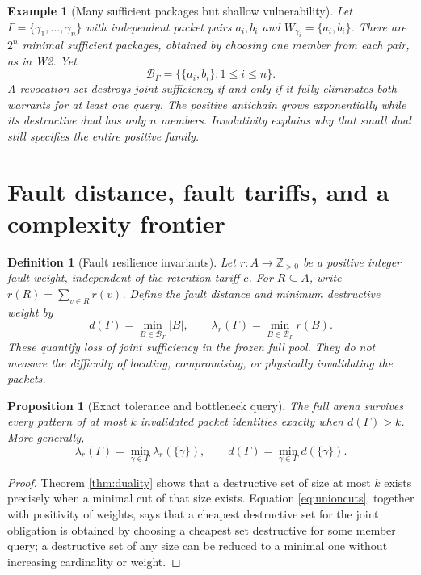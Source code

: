 \documentclass[11pt,letterpaper]{article}
\newtheorem{proposition}[theorem]{Proposition}
\newtheorem{definition}[theorem]{Definition}
\newtheorem{example}[theorem]{Example}
\newcommand{\calB}{\mathcal B}
\newcommand{\Gam}{\Gamma}
\begin{document}
\begin{example}[Many sufficient packages but shallow vulnerability]\label{ex:pairs}
Let $\Gam=\{\gamma_1,\ldots,\gamma_n\}$ with independent packet pairs $a_i,b_i$ and $W_{\gamma_i}=\{a_i,b_i\}$. There are $2^n$ minimal sufficient packages, obtained by choosing one member from each pair, as in W2. Yet
\[
\calB_\Gam=\bigl\{\{a_i,b_i\}:1\le i\le n\bigr\}.
\]
A revocation set destroys joint sufficiency if and only if it fully eliminates both warrants for at least one query. The positive antichain grows exponentially while its destructive dual has only $n$ members. Involutivity explains why that small dual still specifies the entire positive family.
\end{example}

\section{Fault distance, fault tariffs, and a complexity frontier}\label{gl-first-W3-s4}
\begin{definition}[Fault resilience invariants]\label{def:distance}
Let $r:A\to\mathbb Z_{>0}$ be a positive integer \emph{fault weight}, independent of the retention tariff $c$. For $R\subseteq A$, write $r(R)=\sum_{v\in R}r(v)$. Define the \emph{fault distance} and \emph{minimum destructive weight} by
\[
d(\Gam)=\min_{B\in\calB_\Gam}|B|,
\qquad
\lambda_r(\Gam)=\min_{B\in\calB_\Gam}r(B).
\tag{6}\label{eq:weights}
\]
These quantify loss of joint sufficiency in the frozen full pool. They do not measure the difficulty of locating, compromising, or physically invalidating the packets.
\end{definition}

\begin{proposition}[Exact tolerance and bottleneck query]\label{prop:tolerance}
The full arena survives every pattern of at most $k$ invalidated packet identities exactly when $d(\Gam)>k$. More generally,
\[
\lambda_r(\Gam)=\min_{\gamma\in\Gam}\lambda_r(\{\gamma\}),\qquad
d(\Gam)=\min_{\gamma\in\Gam}d(\{\gamma\}).
\tag{7}\label{eq:bottleneck}
\]
\end{proposition}
\begin{proof}
Theorem \ref{thm:duality} shows that a destructive set of size at most $k$ exists precisely when a minimal cut of that size exists. Equation \eqref{eq:unioncuts}, together with positivity of weights, says that a cheapest destructive set for the joint obligation is obtained by choosing a cheapest set destructive for some member query; a destructive set of any size can be reduced to a minimal one without increasing cardinality or weight.
\end{proof}
\end{document}
